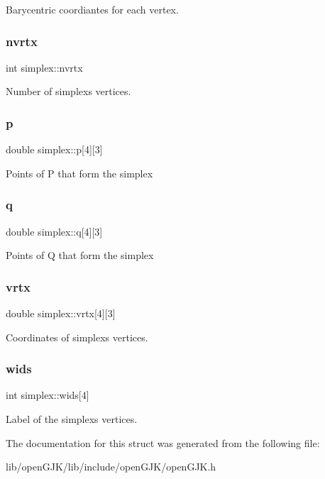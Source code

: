Barycentric coordiantes for each vertex. \mbox{\label{structsimplex_aa906f22fbbb2294125763acaefc1dbca}} 
\subsubsection{\texorpdfstring{nvrtx}{nvrtx}}
{\footnotesize\ttfamily int simplex\+::nvrtx}

Number of simplex\textquotesingle{}s vertices. \mbox{\label{structsimplex_a9784d399d1d417f3545c1bdc961bfac8}} 
\subsubsection{\texorpdfstring{p}{p}}
{\footnotesize\ttfamily double simplex\+::p\mbox{[}4\mbox{]}\mbox{[}3\mbox{]}}

Points of P that form the simplex \mbox{\label{structsimplex_a68c12347e53a0203a32b05cae1b18134}} 
\subsubsection{\texorpdfstring{q}{q}}
{\footnotesize\ttfamily double simplex\+::q\mbox{[}4\mbox{]}\mbox{[}3\mbox{]}}

Points of Q that form the simplex \mbox{\label{structsimplex_a8d5910f99cfc91911760b293a23bdf7c}} 
\subsubsection{\texorpdfstring{vrtx}{vrtx}}
{\footnotesize\ttfamily double simplex\+::vrtx\mbox{[}4\mbox{]}\mbox{[}3\mbox{]}}

Coordinates of simplex\textquotesingle{}s vertices. \mbox{\label{structsimplex_a803e0af74fc3038ff163c4a660bb7934}} 
\subsubsection{\texorpdfstring{wids}{wids}}
{\footnotesize\ttfamily int simplex\+::wids\mbox{[}4\mbox{]}}

Label of the simplex\textquotesingle{}s vertices. 

The documentation for this struct was generated from the following file\+:\begin{DoxyCompactItemize}
\item 
lib/open\+G\+J\+K/lib/include/open\+G\+J\+K/open\+G\+J\+K.\+h\end{DoxyCompactItemize}
